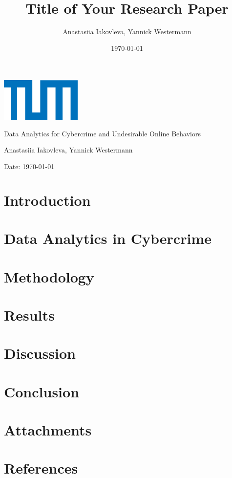\documentclass{article}
\title{Title of Your Research Paper}
\author{Anastasiia Iakovleva, Yannick Westermann}
\date{\today}
\renewcommand\maketitle{
  \begin{titlepage}
    \centering
    \includegraphics[width=0.3\textwidth]{./assets/tum-logo.png} 
    \vspace{1cm}

    \Large
    Data Analytics for Cybercrime and Undesirable Online Behaviors
    \vspace{2cm}

    \Huge
    \thetitle
    \vspace{2cm}

    \Large
    Anastasiia Iakovleva, Yannick Westermann
    \vspace{1cm}

    \normalsize
    Date: \today
    \vspace{1cm}

    \begin{abstract}
        \lipsum[1]
    \end{abstract}
  \end{titlepage}
}
\begin{document}
\maketitle

\newpage
\tableofcontents
\newpage

\section{Introduction}\label{sec:introduction}


\section{Data Analytics in Cybercrime}\label{sec:data-analytics}


\section{Methodology}\label{sec:methodology}


\section{Results}\label{sec:results}


\section{Discussion}\label{sec:discussion}


\section{Conclusion}\label{sec:conclusion}


\section{Attachments}\label{sec:attachments}


\section*{References}\label{sec:references}

\end{document}
